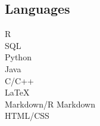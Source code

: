 \documentclass[letterpaper]{deedy-resume} %
\begin{document}
\begin{minipage}[t]{0.33\textwidth}
\sectionspace %
\vspace{3pt}
\subsection{Languages}
R\\
SQL\\
\vspace{4pt}
Python\\
Java\\
C/C++\\
\vspace{4pt}
\LaTeX\\
Markdown/R Markdown\\
HTML/CSS



\end{minipage} %
\hfill
%
%
\end{document}
